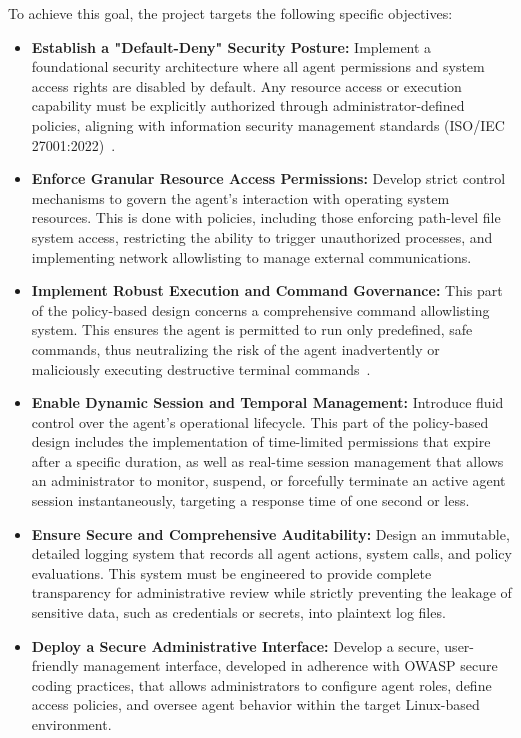 \documentclass[a4paper]{report}
\begin{document}
To achieve this goal, the project targets the following specific objectives:

\begin{itemize}
    \item \textbf{Establish a "Default-Deny" Security Posture:} Implement a foundational security architecture where all agent permissions and system access rights are disabled by default. Any resource access or execution capability must be explicitly authorized through administrator-defined policies, aligning with information security management standards (ISO/IEC 27001:2022)~\cite{ji2025taming}.
    \item \textbf{Enforce Granular Resource Access Permissions:} Develop strict control mechanisms to govern the agent’s interaction with operating system resources. This is done with policies, including those enforcing path-level file system access, restricting the ability to trigger unauthorized processes, and implementing network allowlisting to manage external communications.
    \item \textbf{Implement Robust Execution and Command Governance:} This part of the policy-based design concerns a comprehensive command allowlisting system. This ensures the agent is permitted to run only predefined, safe commands, thus neutralizing the risk of the agent inadvertently or maliciously executing destructive terminal commands~\cite{shan2025dont}.
    \item \textbf{Enable Dynamic Session and Temporal Management:} Introduce fluid control over the agent's operational lifecycle. This part of the policy-based design includes the implementation of time-limited permissions that expire after a specific duration, as well as real-time session management that allows an administrator to monitor, suspend, or forcefully terminate an active agent session instantaneously, targeting a response time of one second or less.
    \item \textbf{Ensure Secure and Comprehensive Auditability:} Design an immutable, detailed logging system that records all agent actions, system calls, and policy evaluations. This system must be engineered to provide complete transparency for administrative review while strictly preventing the leakage of sensitive data, such as credentials or secrets, into plaintext log files.
    \item \textbf{Deploy a Secure Administrative Interface:} Develop a secure, user-friendly management interface, developed in adherence with OWASP secure coding practices, that allows administrators to configure agent roles, define access policies, and oversee agent behavior within the target Linux-based environment.
\end{itemize}
\end{document}
